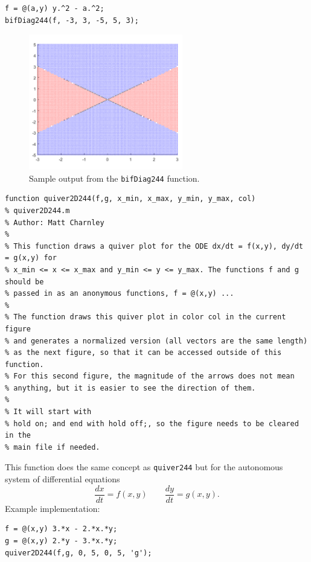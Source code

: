 \documentclass{ximera}
\begin{document}
\begin{verbatim}
f = @(a,y) y.^2 - a.^2;
bifDiag244(f, -3, 3, -5, 5, 3);
\end{verbatim}

\begin{figure}[h!]
    \centering
    \includegraphics[width=0.6\textwidth]{figures/MatlabDemo_bifDiag.png}
    \caption{Sample output from the \texttt{bifDiag244} function.}
    \label{fig:MatlabDemo_BifDiag}
\end{figure}

\begin{verbatim}
function quiver2D244(f,g, x_min, x_max, y_min, y_max, col)
% quiver2D244.m
% Author: Matt Charnley
%
% This function draws a quiver plot for the ODE dx/dt = f(x,y), dy/dt = g(x,y) for
% x_min <= x <= x_max and y_min <= y <= y_max. The functions f and g should be
% passed in as an anonymous functions, f = @(x,y) ... 
%
% The function draws this quiver plot in color col in the current figure
% and generates a normalized version (all vectors are the same length)
% as the next figure, so that it can be accessed outside of this function.
% For this second figure, the magnitude of the arrows does not mean
% anything, but it is easier to see the direction of them. 
%
% It will start with
% hold on; and end with hold off;, so the figure needs to be cleared in the
% main file if needed.
\end{verbatim}

This function does the same concept as \texttt{quiver244} but for the autonomous system of differential equations \[ \frac{dx}{dt} = f(x,y) \qquad \frac{dy}{dt} = g(x,y). \] Example implementation:

\begin{verbatim}
f = @(x,y) 3.*x - 2.*x.*y;
g = @(x,y) 2.*y - 3.*x.*y;
quiver2D244(f,g, 0, 5, 0, 5, 'g');
\end{verbatim}
\end{document}
